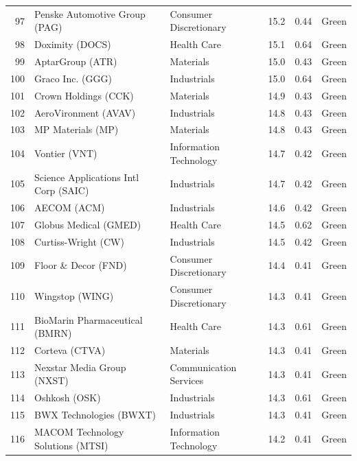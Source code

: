 \documentclass[11pt,a4paper]{article}
\begin{document}
{\begin{longtable}{r p{4.6cm} p{3cm} r r l}
97 & Penske Automotive Group (PAG) & Consumer Discretionary & 15.2 & 0.44 & \cellcolor[HTML]{C6EFCE}Green \\
98 & Doximity (DOCS) & Health Care & 15.1 & 0.64 & \cellcolor[HTML]{C6EFCE}Green \\
99 & AptarGroup (ATR) & Materials & 15.0 & 0.43 & \cellcolor[HTML]{C6EFCE}Green \\
100 & Graco Inc. (GGG) & Industrials & 15.0 & 0.64 & \cellcolor[HTML]{C6EFCE}Green \\
101 & Crown Holdings (CCK) & Materials & 14.9 & 0.43 & \cellcolor[HTML]{C6EFCE}Green \\
102 & AeroVironment (AVAV) & Industrials & 14.8 & 0.43 & \cellcolor[HTML]{C6EFCE}Green \\
103 & MP Materials (MP) & Materials & 14.8 & 0.43 & \cellcolor[HTML]{C6EFCE}Green \\
104 & Vontier (VNT) & Information Technology & 14.7 & 0.42 & \cellcolor[HTML]{C6EFCE}Green \\
105 & Science Applications Intl Corp (SAIC) & Industrials & 14.7 & 0.42 & \cellcolor[HTML]{C6EFCE}Green \\
106 & AECOM (ACM) & Industrials & 14.6 & 0.42 & \cellcolor[HTML]{C6EFCE}Green \\
107 & Globus Medical (GMED) & Health Care & 14.5 & 0.62 & \cellcolor[HTML]{C6EFCE}Green \\
108 & Curtiss-Wright (CW) & Industrials & 14.5 & 0.42 & \cellcolor[HTML]{C6EFCE}Green \\
109 & Floor \& Decor (FND) & Consumer Discretionary & 14.4 & 0.41 & \cellcolor[HTML]{C6EFCE}Green \\
110 & Wingstop (WING) & Consumer Discretionary & 14.3 & 0.41 & \cellcolor[HTML]{C6EFCE}Green \\
111 & BioMarin Pharmaceutical (BMRN) & Health Care & 14.3 & 0.61 & \cellcolor[HTML]{C6EFCE}Green \\
112 & Corteva (CTVA) & Materials & 14.3 & 0.41 & \cellcolor[HTML]{C6EFCE}Green \\
113 & Nexstar Media Group (NXST) & Communication Services & 14.3 & 0.41 & \cellcolor[HTML]{C6EFCE}Green \\
114 & Oshkosh (OSK) & Industrials & 14.3 & 0.61 & \cellcolor[HTML]{C6EFCE}Green \\
115 & BWX Technologies (BWXT) & Industrials & 14.3 & 0.41 & \cellcolor[HTML]{C6EFCE}Green \\
116 & MACOM Technology Solutions (MTSI) & Information Technology & 14.2 & 0.41 & \cellcolor[HTML]{C6EFCE}Green \\

\end{longtable}}
\end{document}
